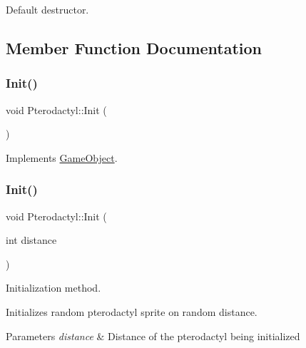 Default destructor. 



\subsection{Member Function Documentation}
\mbox{\label{class_pterodactyl_abb1effe2b67ceabf7494d3f104fc20b5}} 
\subsubsection{\texorpdfstring{Init()}{Init()}\hspace{0.1cm}{\footnotesize\ttfamily [1/2]}}
{\footnotesize\ttfamily void Pterodactyl\+::\+Init (\begin{DoxyParamCaption}{ }\end{DoxyParamCaption})\hspace{0.3cm}{\ttfamily [virtual]}}



Implements \mbox{\hyperlink{class_game_object_ab3b70fcc4e640ba2081508b1efb35536}{Game\+Object}}.

\mbox{\label{class_pterodactyl_a55037eb1d5ed42027e9c0cf9891b3f70}} 
\subsubsection{\texorpdfstring{Init()}{Init()}\hspace{0.1cm}{\footnotesize\ttfamily [2/2]}}
{\footnotesize\ttfamily void Pterodactyl\+::\+Init (\begin{DoxyParamCaption}\item[{int}]{distance }\end{DoxyParamCaption})}



Initialization method. 

Initializes random pterodactyl sprite on random distance.


\begin{DoxyParams}{Parameters}
{\em distance} & Distance of the pterodactyl being initialized \\
\hline
\end{DoxyParams}
\mbox{\label{class_pterodactyl_a8ab71be091355092560c40746bf53bef}} 
